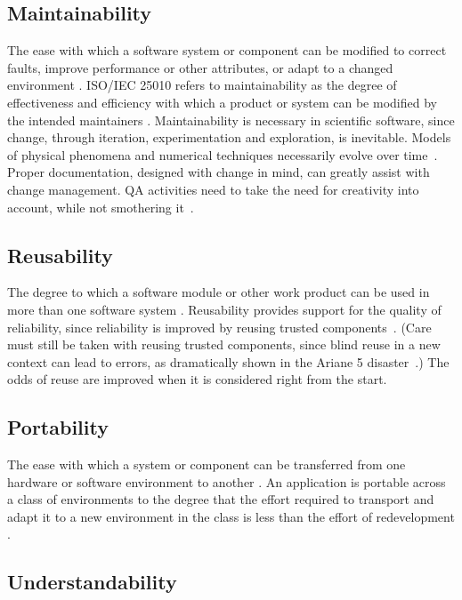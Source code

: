 \documentclass[12pt]{article}
\begin{document}
\subsection{Maintainability}

The ease with which a software system or component can be modified to correct faults, improve performance or other attributes, or adapt to a changed environment \cite{IEEEStdGlossarySET1990}. ISO/IEC 25010 refers to maintainability as the degree of effectiveness and efficiency with which a product or system can be modified by the intended maintainers \cite{ISO/IEC25010}.
Maintainability is necessary in scientific software, since change, through iteration, experimentation and exploration, is inevitable.  Models of physical phenomena and numerical techniques necessarily evolve over time~\cite{CarverEtAl2007, SegalAndMorris2008}.  Proper documentation, designed with change in mind, can greatly assist with change management.  QA activities need to take the need for creativity into account, while not smothering
it~\cite[p.~352]{Roache1998}.

\subsection{Reusability}

The degree to which a software module or other work product can be used in more than one software system \cite{IEEEStdGlossarySET1990}. Reusability provides support for the quality of reliability, since reliability
is improved by reusing trusted components~\cite{Dubois2005}.  (Care must still
be taken with reusing trusted components, since blind reuse in a new context can lead to errors, as dramatically shown in the Ariane 5 disaster~\cite[p.~37--38]{OliveiraAndStewart2006}.)  The odds of reuse are improved when it is considered right from the start.

\subsection{Portability}

The ease with which a system or component can be transferred from one hardware or software environment to another \cite{IEEEStdGlossarySET1990}. An application is portable across a class of environments to the degree that the effort required to transport and adapt it to a new environment in the class is less than the effort of redevelopment \cite{mooney1990strategies}.
 

\subsection{Understandability}
\end{document}
